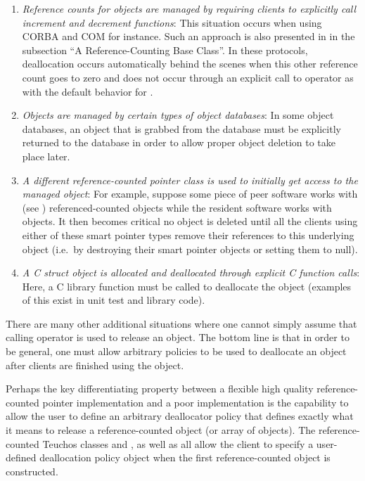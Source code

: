 \documentclass[pdf,ps2pdf,11pt]{SANDreport}
\begin{document}
\begin{enumerate}

{}\item\textit{Reference counts for objects are managed by requiring
clients to explicitly call increment and decrement functions}: This
situation occurs when using CORBA {}\cite{ref:corba} and COM
{}\cite{ref:com} for instance.  Such an approach is also presented in
{}\cite[Item 29]{MoreEffectiveC++96} in the subsection ``A
Reference-Counting Base Class''.  In these protocols, deallocation
occurs automatically behind the scenes when this other reference count
goes to zero and does not occur through an explicit call to operator
{} as with the default behavior for {}.

{}\item\textit{Objects are managed by certain types of object
databases}: In some object databases, an object that is grabbed from
the database must be explicitly returned to the database in order to
allow proper object deletion to take place later.

{}\item\textit{A different reference-counted pointer class is used to
initially get access to the managed object}: For example, suppose some
piece of peer software works with {} (see
{}\cite{ref:boost}) referenced-counted objects while the resident
software works with {} objects.  It then becomes critical no
object is deleted until all the clients using either of these smart
pointer types remove their references to this underlying object (i.e.\
by destroying their smart pointer objects or setting them to null).

{}\item\textit{A C struct object is allocated and deallocated through
explicit C function calls}: Here, a C library function must be called
to deallocate the object (examples of this exist in unit test and
library code).

\end{enumerate}

There are many other additional situations where one cannot simply
assume that calling operator {}\ttt{delete} is used to release an
object.  The bottom line is that in order to be general, one must
allow arbitrary policies to be used to deallocate an object after
clients are finished using the object.

Perhaps the key differentiating property between a flexible high
quality reference-counted pointer implementation and a poor
implementation is the capability to allow the user to define an
arbitrary deallocator policy that defines exactly what it means to
release a reference-counted object (or array of objects).  The
reference-counted Teuchos classes {} and
{}, as well as {} all
allow the client to specify a user-defined deallocation policy object
when the first reference-counted object is constructed.
\end{document}

